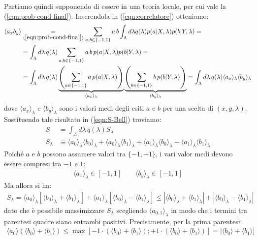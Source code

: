 \documentclass[../../InformazioneQuantistica.tex]{subfiles}
\begin{document}
Partiamo quindi supponendo di essere in una teoria locale, per cui vale la (\ref{eqn:prob-cond-final}). Inserendola in (\ref{eqn:correlatore}) otteniamo:
\begin{align*}
\langle a_x b_y \rangle &\underset{(\ref{eqn:prob-cond-final})}{=} \sum_{a,b\in\{-1,1\}} a\,b \int_\Lambda d\lambda q(\lambda) p(a|X,\lambda) p(b|Y,\lambda) =\\
&=
 \int_\Lambda d\lambda\, q(\lambda) \sum_{a,b \in\{-1,1\}} a\, b\, p(a|X,\lambda)p(b|Y,\lambda)=\\
&= \int_\Lambda d\lambda\, q(\lambda)\underbrace{\left(\sum_{a\in \{-1,1\}} a\, p(a|X,\lambda)\right)}_{\langle a_x \rangle_\lambda} \underbrace{\left(\sum_{b\in \{-1,1\}} b\, p(b|Y,\lambda)\right)}_{\langle b_y \rangle_\lambda} = \int_\Lambda d\lambda\, q(\lambda) \langle a_x\rangle_\lambda \langle b_y\rangle_\lambda
\end{align*}
dove $\langle a_x\rangle_\lambda$ e $\langle b_y\rangle_\lambda$ sono i valori medi degli esiti $a$ e $b$ per una scelta di $(x,y,\lambda)$.\\
Sostituendo tale risultato in (\ref{eqn:S-Bell}) troviamo:
\begin{align*}
S &= \int_\Lambda d\lambda \, q(\lambda) S_\lambda \\
S_\lambda &\equiv \langle a_0 \rangle_\lambda \langle b_0 \rangle_\lambda + \langle a_0\rangle_\lambda \langle b_1 \rangle_\lambda + \langle a_1 \rangle_\lambda \langle b_0 \rangle_\lambda - \langle a_1 \rangle_\lambda \langle b_1 \rangle_\lambda
\end{align*}
Poiché $a$ e $b$ possono assumere valori tra $\{-1,+1\}$, i vari valor medi devono essere compresi tra $-1$ e $1$:
\begin{align*}
\langle a_x \rangle_\lambda \in [-1,1] \qquad \langle b_y\rangle_\lambda \in [-1,1]
\end{align*}
Ma allora si ha:
\begin{align*}
S_\lambda = \langle a_0 \rangle_\lambda \left[ \langle b_0\rangle_\lambda + \langle b_1 \rangle_\lambda \right] + \langle a_1 \rangle_\lambda \left[\langle b_0 \rangle_\lambda - \langle b_1 \rangle_\lambda \right] \leq  |\langle b_0 \rangle_\lambda + \langle b_1 \rangle_\lambda | + |\langle b_0\rangle_\lambda - \langle b_1 \rangle_\lambda|
\end{align*}
dato che è possibile massimizzare $S_\lambda$ scegliendo $\langle a_{0,1}\rangle_\lambda$ in modo che i termini tra parentesi quadre siano entrambi positivi. Precisamente, per la prima parentesi:
\begin{align*}
\langle a_0\rangle(\langle b_0\rangle + \langle b_1\rangle) \leq \max[-1\cdot (\langle b_0\rangle + \langle b_1\rangle); +1\cdot (\langle b_0 \rangle + \langle b_1 \rangle)] = |\langle b_0\rangle + \langle b_1 \rangle ]
\end{align*}
\end{document}
